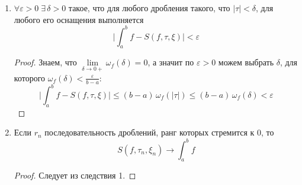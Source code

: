 \begin{follow}
  \begin{enumerate}
    \item $\forall \varepsilon > 0 \; \exists \, \delta > 0$ такое, что для любого дробления такого, что $|\tau| < \delta$, для любого его оснащения выполняется
    \begin{equation*}
        \Big| \int_{a}^{b} f -
        S(f, \tau, \xi)\Big| < \varepsilon
    \end{equation*}
    \begin{proof}
        Знаем, что $\lim\limits_{\delta \to 0+} \omega_f(\delta) = 0$, а значит по $\varepsilon > 0$ можем выбрать $\delta$, для которого $\omega_f(\delta) < \frac{\varepsilon}{b - a}$:
        \begin{equation*}
            \Big| \int_{a}^{b} f - S(f, \tau, \xi)\Big| \leq
            (b - a)\, \omega_f(|\tau|) \leq (b - a)\, \omega_f(\delta) < \varepsilon
        \end{equation*}
    \end{proof}

    \item Если $r_n$ последовательность дроблений, ранг которых стремится к $0$, то
    \begin{equation*}
        S(f, \tau_n, \xi_n) \longrightarrow \int_{a}^{b} f
    \end{equation*}
    \begin{proof}
        Следует из следствия 1.
    \end{proof}
  \end{enumerate}
\end{follow}

